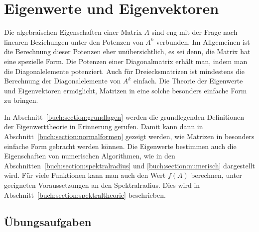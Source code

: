 %
%
%
\chapter{Eigenwerte und Eigenvektoren
\label{buch:chapter:eigenwerte-und-eigenvektoren}}
\rhead{}
Die algebraischen Eigenschaften einer Matrix $A$ sind eng mit der
Frage nach linearen Beziehungen unter den Potenzen von $A^k$ verbunden.
Im Allgemeinen ist die Berechnung dieser Potenzen eher unübersichtlich,
es sei denn, die Matrix hat eine spezielle Form.
Die Potenzen einer Diagonalmatrix erhält man, indem man die Diagonalelemente
potenziert.
Auch für Dreiecksmatrizen ist mindestens die Berechnung der Diagonalelemente
von $A^k$ einfach.
Die Theorie der Eigenwerte und Eigenvektoren ermöglicht, Matrizen in
eine solche besonders einfache Form zu bringen.

In Abschnitt~\ref{buch:section:grundlagen} werden die grundlegenden
Definitionen der Eigenwerttheorie in Erinnerung gerufen.
Damit kann dann in Abschnitt~\ref{buch:section:normalformen}
gezeigt werden, wie Matrizen in besonders einfache Form gebracht
werden können.
Die Eigenwerte bestimmen auch die Eigenschaften von numerischen
Algorithmen, wie in den Abschnitten~\ref{buch:section:spektralradius}
und \ref{buch:section:numerisch} dargestellt wird.
Für viele Funktionen kann man auch den Wert $f(A)$ berechnen, unter
geeigneten Voraussetzungen an den Spektralradius.
Dies wird in Abschnitt~\ref{buch:section:spektraltheorie} beschrieben.








\section*{Übungsaufgaben}
\begin{uebungsaufgaben}
\end{uebungsaufgaben}

